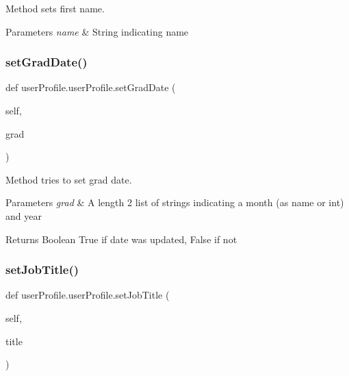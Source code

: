 Method sets first name. 


\begin{DoxyParams}{Parameters}
{\em name} & String indicating name \\
\hline
\end{DoxyParams}
\mbox{\label{classuserProfile_1_1userProfile_a49e06c1b0a539a79d66108e096fc46d6}} 
\subsubsection{\texorpdfstring{set\+Grad\+Date()}{setGradDate()}}
{\footnotesize\ttfamily def user\+Profile.\+user\+Profile.\+set\+Grad\+Date (\begin{DoxyParamCaption}\item[{}]{self,  }\item[{}]{grad }\end{DoxyParamCaption})}



Method tries to set grad date. 


\begin{DoxyParams}{Parameters}
{\em grad} & A length 2 list of strings indicating a month (as name or int) and year \\
\hline
\end{DoxyParams}
\begin{DoxyReturn}{Returns}
Boolean True if date was updated, False if not 
\end{DoxyReturn}
\mbox{\label{classuserProfile_1_1userProfile_aa8d7bc0df8fb26fe203b8c6459cd403c}} 
\subsubsection{\texorpdfstring{set\+Job\+Title()}{setJobTitle()}}
{\footnotesize\ttfamily def user\+Profile.\+user\+Profile.\+set\+Job\+Title (\begin{DoxyParamCaption}\item[{}]{self,  }\item[{}]{title }\end{DoxyParamCaption})}




